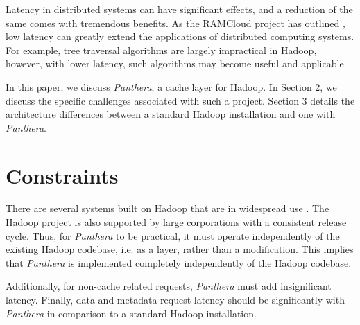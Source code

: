 \documentclass{article}
\begin{document}
Latency in distributed systems can have significant effects, and a reduction of the same comes with tremendous benefits. As the RAMCloud project has outlined \cite{ramcloud}, low latency can greatly extend the applications of distributed computing systems. For example, tree traversal algorithms are largely impractical in Hadoop, however, with lower latency, such algorithms may become useful and applicable.

In this paper, we discuss \textit{Panthera}, a cache layer for Hadoop. In Section 2, we discuss the specific challenges associated with such a project. Section 3 details the architecture differences between a standard Hadoop installation and one with \textit{Panthera}. 

\section{Constraints}

There are several systems built on Hadoop that are in widespread use \cite{hbase, cloudbatch, pig}. The Hadoop project is also supported by large corporations with a 
consistent release cycle. Thus, for \textit{Panthera} to be practical, it must operate independently of the existing Hadoop codebase, i.e. as a layer, rather than a modification. This implies that \textit{Panthera} is implemented completely independently of the Hadoop codebase.

Additionally, for non-cache related requests, \textit{Panthera} must add insignificant latency. Finally, data and metadata request latency should be significantly with \textit{Panthera} in comparison to a standard Hadoop installation.
\end{document}
